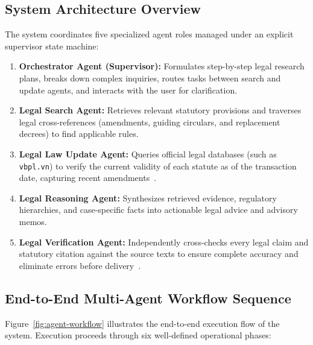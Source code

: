 \subsection{System Architecture Overview}
The system coordinates five specialized agent roles managed under an explicit supervisor state machine:
\begin{enumerate}
  \item \textbf{Orchestrator Agent (Supervisor):} Formulates step-by-step legal research plans, breaks down complex inquiries, routes tasks between search and update agents, and interacts with the user for clarification.
  \item \textbf{Legal Search Agent:} Retrieves relevant statutory provisions and traverses legal cross-references (amendments, guiding circulars, and replacement decrees) to find applicable rules.
  \item \textbf{Legal Law Update Agent:} Queries official legal databases (such as \texttt{vbpl.vn}) to verify the current validity of each statute as of the transaction date, capturing recent amendments~\cite{fan2026timetravel}.
  \item \textbf{Legal Reasoning Agent:} Synthesizes retrieved evidence, regulatory hierarchies, and case-specific facts into actionable legal advice and advisory memos.
  \item \textbf{Legal Verification Agent:} Independently cross-checks every legal claim and statutory citation against the source texts to ensure complete accuracy and eliminate errors before delivery~\cite{qian2026gandr,wei2024safe}.
\end{enumerate}

\subsection{End-to-End Multi-Agent Workflow Sequence}

Figure~\ref{fig:agent-workflow} illustrates the end-to-end execution flow of the system. Execution proceeds through six well-defined operational phases:

